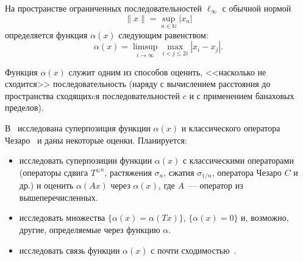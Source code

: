 \documentclass[a4paper,openbib]{report}
\theoremstyle{definition}
\begin{document}




На пространстве ограниченных последовательностей $\ell_\infty$ с обычной нормой
\begin{equation}
	\|x\| = \sup_{n\in\mathbb{N}} |x_n|
\end{equation}
определяется функция $\alpha(x)$ следующим равенством:
\begin{equation}
	\alpha(x) = \limsup_{i\to\infty} \max_{i<j\leqslant 2i} |x_i - x_j|
	.
\end{equation}

Функция $\alpha(x)$ служит одним из способов оценить,
<<насколько не сходится>> последовательность
(наряду с вычислением расстояния до пространства сходящихcя последовательностей $c$
и с применением банаховых пределов).

В~\cite{our-vzms-2018} исследована суперпозиция функции $\alpha(x)$ и классического оператора Чезаро~\cite{Semenov2010invariant}
и даны некоторые оценки.
Планируется:
\begin{itemize}
\item
исследовать суперпозиции функции $\alpha(x)$ с классическими операторами
(операторы сдвига $T^{\pm n}$, растяжения $\sigma_n$, сжатия $\sigma_{1/n}$, оператора Чезаро $C$ и др.)
и оценить $\alpha(Ax)$ через $\alpha(x)$, где $A$~--- оператор из вышеперечисленных.
\item
исследовать множества
$\{\alpha(x) = \alpha(Tx)\}$,
$\{\alpha(x) = 0\}$
и, возможно, другие, определяемые через функцию $\alpha$.
\item
исследовать связь функции $\alpha(x)$ с почти сходимостью~\cite{lorentz1948contribution,usachev2008transformations}.

\end{itemize}


\printbibliography{}
\end{document}
